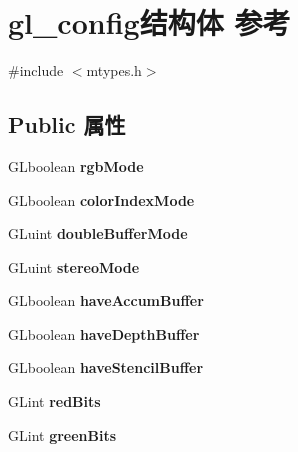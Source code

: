 \hypertarget{structgl__config}{}\section{gl\+\_\+config结构体 参考}
\label{structgl__config}


{\ttfamily \#include $<$mtypes.\+h$>$}

\subsection*{Public 属性}
\begin{DoxyCompactItemize}
\item 
\mbox{\label{structgl__config_a050c72c2692e20ee89664d9d40a98068}} 
G\+Lboolean {\bfseries rgb\+Mode}
\item 
\mbox{\label{structgl__config_a9196f9622e912036e32c05165e18a339}} 
G\+Lboolean {\bfseries color\+Index\+Mode}
\item 
\mbox{\label{structgl__config_a89419f3ca8d374c65f8be356ef3b9ec0}} 
G\+Luint {\bfseries double\+Buffer\+Mode}
\item 
\mbox{\label{structgl__config_a37383c4df86ee18b241e15f139972644}} 
G\+Luint {\bfseries stereo\+Mode}
\item 
\mbox{\label{structgl__config_a434f227527668239e23e746539bc7833}} 
G\+Lboolean {\bfseries have\+Accum\+Buffer}
\item 
\mbox{\label{structgl__config_a98a131bd339038acff0bf87c599ac673}} 
G\+Lboolean {\bfseries have\+Depth\+Buffer}
\item 
\mbox{\label{structgl__config_a082e307d26b86e851145e6347b2c0f47}} 
G\+Lboolean {\bfseries have\+Stencil\+Buffer}
\item 
\mbox{\label{structgl__config_acd3540985fa68e3ffb552f29263669ef}} 
G\+Lint {\bfseries red\+Bits}
\item 
\mbox{\label{structgl__config_a17731f62588b50259308cb84a804c4d8}} 
G\+Lint {\bfseries green\+Bits}

\end{DoxyCompactItemize}
